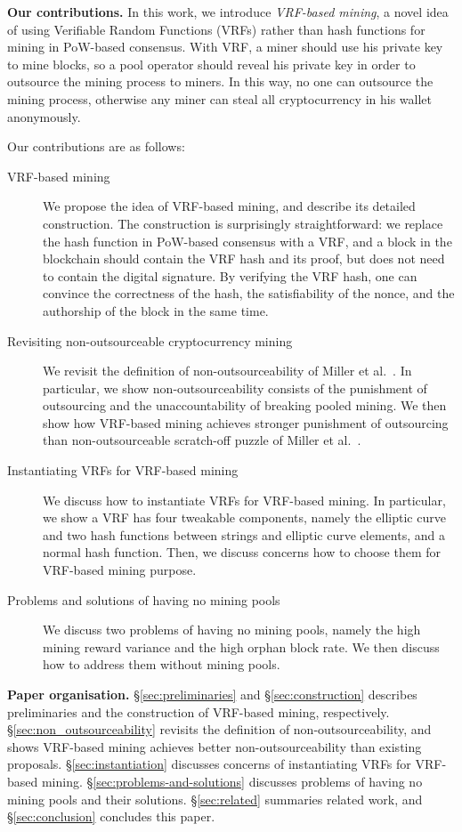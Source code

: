 \textbf{Our contributions.}
In this work, we introduce \textit{VRF-based mining}, a novel idea of using Verifiable Random Functions (VRFs) rather than hash functions for mining in PoW-based consensus.
With VRF, a miner should use his private key to mine blocks, so a pool operator should reveal his private key in order to outsource the mining process to miners.
In this way, no one can outsource the mining process, otherwise any miner can steal all cryptocurrency in his wallet anonymously.

Our contributions are as follows:

\begin{description}
    \item [VRF-based mining] We propose the idea of VRF-based mining, and describe its detailed construction. The construction is surprisingly straightforward: we replace the hash function in PoW-based consensus with a VRF, and a block in the blockchain should contain the VRF hash and its proof, but does not need to contain the digital signature. By verifying the VRF hash, one can convince the correctness of the hash, the satisfiability of the nonce, and the authorship of the block in the same time.
    \item [Revisiting non-outsourceable cryptocurrency mining] We revisit the definition of non-outsourceability of Miller et al.~\cite{miller2015nonoutsourceable}. In particular, we show non-outsourceability consists of the punishment of outsourcing and the unaccountability of breaking pooled mining. We then show how VRF-based mining achieves stronger punishment of outsourcing than non-outsourceable scratch-off puzzle of Miller et al.~\cite{miller2015nonoutsourceable}.
    \item [Instantiating VRFs for VRF-based mining] We discuss how to instantiate VRFs for VRF-based mining. In particular, we show a VRF has four tweakable components, namely the elliptic curve and two hash functions between strings and elliptic curve elements, and a normal hash function. Then, we discuss concerns how to choose them for VRF-based mining purpose.
    \item [Problems and solutions of having no mining pools] We discuss two problems of having no mining pools, namely the high mining reward variance and the high orphan block rate. We then discuss how to address them without mining pools.
\end{description}

\textbf{Paper organisation.}
\S\ref{sec:preliminaries} and \S\ref{sec:construction} describes preliminaries and the construction of VRF-based mining, respectively.
\S\ref{sec:non_outsourceability} revisits the definition of non-outsourceability, and shows VRF-based mining achieves better non-outsourceability than existing proposals.
\S\ref{sec:instantiation} discusses concerns of instantiating VRFs for VRF-based mining.
\S\ref{sec:problems-and-solutions} discusses problems of having no mining pools and their solutions.
\S\ref{sec:related} summaries related work, and \S\ref{sec:conclusion} concludes this paper.
